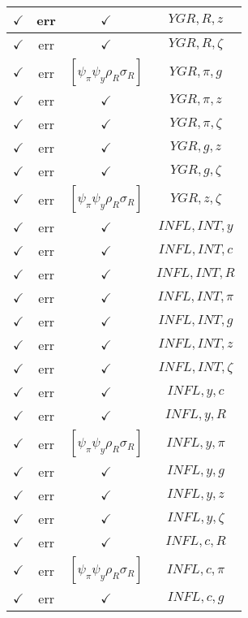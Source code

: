 \documentclass[a4paper,10pt]{article}
\begin{document}
\begin{longtable}{|c|c|c|c|}
\hline
$\checkmark$ & err & $\checkmark$ & ${YGR},{R},{z}$ \\
\hline
$\checkmark$ & err & $\checkmark$ & ${YGR},{R},{\zeta}$ \\
\hline
$\checkmark$ & err & $[\psi_\pi \psi_y \rho_R \sigma_R ]$ & ${YGR},{\pi},{g}$ \\
\hline
$\checkmark$ & err & $\checkmark$ & ${YGR},{\pi},{z}$ \\
\hline
$\checkmark$ & err & $\checkmark$ & ${YGR},{\pi},{\zeta}$ \\
\hline
$\checkmark$ & err & $\checkmark$ & ${YGR},{g},{z}$ \\
\hline
$\checkmark$ & err & $\checkmark$ & ${YGR},{g},{\zeta}$ \\
\hline
$\checkmark$ & err & $[\psi_\pi \psi_y \rho_R \sigma_R ]$ & ${YGR},{z},{\zeta}$ \\
\hline
$\checkmark$ & err & $\checkmark$ & ${INFL},{INT},{y}$ \\
\hline
$\checkmark$ & err & $\checkmark$ & ${INFL},{INT},{c}$ \\
\hline
$\checkmark$ & err & $\checkmark$ & ${INFL},{INT},{R}$ \\
\hline
$\checkmark$ & err & $\checkmark$ & ${INFL},{INT},{\pi}$ \\
\hline
$\checkmark$ & err & $\checkmark$ & ${INFL},{INT},{g}$ \\
\hline
$\checkmark$ & err & $\checkmark$ & ${INFL},{INT},{z}$ \\
\hline
$\checkmark$ & err & $\checkmark$ & ${INFL},{INT},{\zeta}$ \\
\hline
$\checkmark$ & err & $\checkmark$ & ${INFL},{y},{c}$ \\
\hline
$\checkmark$ & err & $\checkmark$ & ${INFL},{y},{R}$ \\
\hline
$\checkmark$ & err & $[\psi_\pi \psi_y \rho_R \sigma_R ]$ & ${INFL},{y},{\pi}$ \\
\hline
$\checkmark$ & err & $\checkmark$ & ${INFL},{y},{g}$ \\
\hline
$\checkmark$ & err & $\checkmark$ & ${INFL},{y},{z}$ \\
\hline
$\checkmark$ & err & $\checkmark$ & ${INFL},{y},{\zeta}$ \\
\hline
$\checkmark$ & err & $\checkmark$ & ${INFL},{c},{R}$ \\
\hline
$\checkmark$ & err & $[\psi_\pi \psi_y \rho_R \sigma_R ]$ & ${INFL},{c},{\pi}$ \\
\hline
$\checkmark$ & err & $\checkmark$ & ${INFL},{c},{g}$ \\

\end{longtable}
\end{document}
